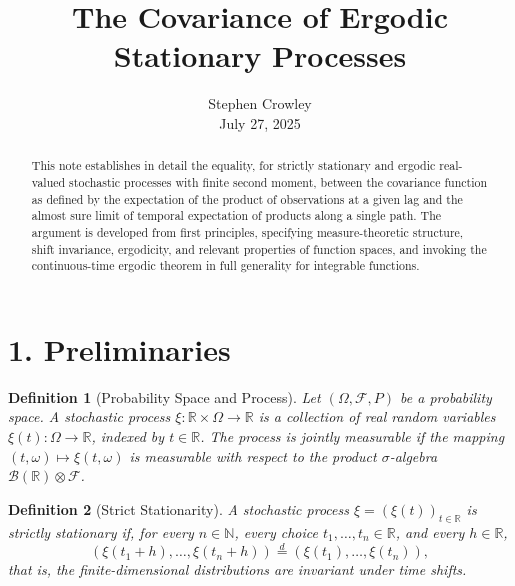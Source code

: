 \documentclass{article}
\newcommand{\tmaffiliation}[1]{\\ #1}
\newcommand{\tmem}[1]{{\em #1\/}}
\newtheorem{definition}{Definition}
\begin{document}
\title{The Covariance of Ergodic Stationary Processes}

\author{
  Stephen Crowley
  \tmaffiliation{July 27, 2025}
}

\maketitle

\begin{abstract}
  This note establishes in detail the equality, for strictly stationary and
  ergodic real-valued stochastic processes with finite second moment, between
  the covariance function as defined by the expectation of the product of
  observations at a given lag and the almost sure limit of temporal
  expectation of products along a single path. The argument is developed from
  first principles, specifying measure-theoretic structure, shift invariance,
  ergodicity, and relevant properties of function spaces, and invoking the
  continuous-time ergodic theorem in full generality for integrable functions.
\end{abstract}

\section*{1. Preliminaries}

\begin{definition}
  [Probability Space and Process] Let $(\Omega, \mathcal{F}, P)$ be a
  probability space. A {\tmem{stochastic process}} $\xi : \mathbb{R} \times
  \Omega \to \mathbb{R}$ is a collection of real random variables $\xi (t) :
  \Omega \to \mathbb{R}$, indexed by $t \in \mathbb{R}$. The process is
  {\tmem{jointly measurable}} if the mapping $(t, \omega) \mapsto \xi (t,
  \omega)$ is measurable with respect to the product $\sigma$-algebra
  $\mathcal{B} (\mathbb{R}) \otimes \mathcal{F}$.
\end{definition}

\begin{definition}
  [Strict Stationarity] A stochastic process $\xi = (\xi (t))_{t \in
  \mathbb{R}}$ is {\tmem{strictly stationary}} if, for every $n \in
  \mathbb{N}$, every choice $t_1, \ldots, t_n \in \mathbb{R}$, and every $h
  \in \mathbb{R}$,
  \[ (\xi (t_1 + h), \ldots, \xi (t_n + h)) \overset{d}{=} (\xi (t_1), \ldots,
     \xi (t_n)), \]
  that is, the finite-dimensional distributions are invariant under time
  shifts.
\end{definition}
\end{document}
